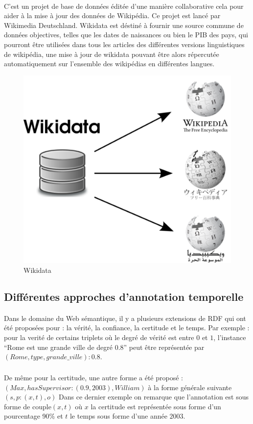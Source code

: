 \documentclass[12pt,a4]{report}
\begin{document}
\paragraph{}
C'est un projet de base de données éditée d'une manière collaborative cela pour aider à la mise à jour des données de Wikipédia. Ce projet est lancé par Wikimedia Deutschland. Wikidata est déstiné à fournir une source commune de données objectives, telles que les dates de naissances ou bien le PIB des pays, qui pourront être utilisées dans tous les articles des différentes versions linguistiques de wikipédia, une mise à jour de wikidata  pouvant être alors répercutée automatiquement sur l'ensemble des wikipédias en différentes langues.   
\begin{figure}[H]
\centering
\includegraphics[width=12cm]{wikidatawikipedia.png}
\caption{Wikidata}
\end{figure}

\subsection{Différentes approches d'annotation temporelle}			
\paragraph{}
Dans le domaine du Web sémantique, il y a plusieurs extensions de RDF qui ont été proposées pour : la vérité, la confiance, la certitude et le temps.
Par exemple : pour la verité de certains triplets où le degré de vérité est entre $0$ et $1$, l’instance “Rome est une grande ville de degré 0.8” peut être représentée par $(Rome, type,grande{\_}ville) : 0.8$.
\subparagraph{}
De même pour la certitude, une autre forme a été proposé :
$(Max,hasSupervisor : (0.9,2003),William)$ à la forme générale suivante $(s, p : (x,t),o)$
\newline
Dans ce dernier exemple on remarque que l'annotation est sous forme de couple$(x, t)$ où $x$ la certitude est représentée sous forme d'un pourcentage 90\% et $t$ le temps sous forme d'une année $2003$.
\end{document}
